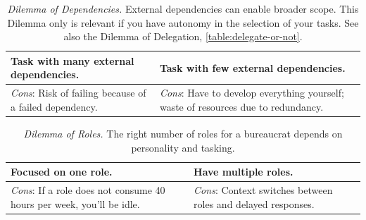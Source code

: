 

\begin{center}
\begin{table}[H] %
\begin{tabular}{ | m{\dilemmatablewidth}| m{\dilemmatablewidth} | } 
  \hline
  \textbf{Task with many external dependencies.} & 
  \textbf{Task with few external dependencies.} \\ 
  \hline
  \textit{Cons}: Risk of failing because of a failed dependency. & 
  \textit{Cons}: Have to develop everything yourself; waste of resources due to redundancy. \\  
  \hline
\end{tabular}
\caption{
\textit{Dilemma of Dependencies.}
External dependencies can enable broader scope. This Dilemma only is relevant if you have autonomy in the selection of your tasks. See also the Dilemma of Delegation, \ref{table:delegate-or-not}.
}
\label{table:number-of-external-dependencies}
\end{table}
\end{center}



\begin{center}
\begin{table}[H] %
\begin{tabular}{ | m{\dilemmatablewidth}| m{\dilemmatablewidth} | } 
  \hline
  \textbf{Focused on one role.} & 
  \textbf{Have multiple roles.} \\ 
  \hline
  \textit{Cons}: If a role does not consume 40 hours per week, you'll be idle. & 
  \textit{Cons}: Context switches between roles and delayed responses. \\  
  \hline
\end{tabular}
\caption{
\textit{Dilemma of Roles.}
The right number of roles for a bureaucrat depends on personality and tasking. 
}
\label{table:number-of-roles}
\end{table}
\end{center}

